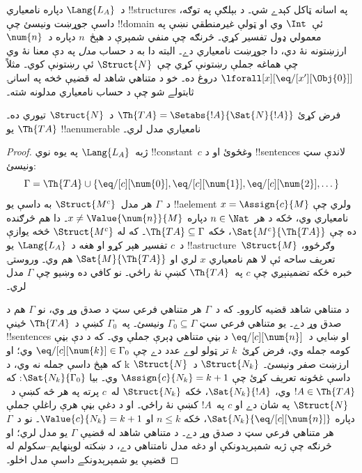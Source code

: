 \documentclass[../../../include/open-logic-section]{subfiles}
\begin{document}
\begin{explain}
د~$\Lang{L_A}$ دپاره نامعياري !!{structure}s په اسانه ټاکل کېدے
شي۔ د بېلګې په توګه، داسې جوړښت ونيسئ چې !!{domain} ئې~$\Int$ وي او
ټولې غيرمنطقي نښې په معمولي ډول تفسير کړي۔ څرنګه چې منفي شمېرې د
هېڅ~$n$ دپاره د~$\num{n}$ ارزښتونه نۀ دي، دا جوړښت نامعياري دے۔
البته دا به د حساب \emph{مدل} په دې معنا نۀ وي چې هماغه جملې رښتونې
کړي چې~$\Struct{N}$ ئې رښتونې کوي۔ مثلاً
$\lforall[x][\eq/[x'][\Obj{0}]]$ دروغ ده۔ خو د متناهي شاهد له قضيې
څخه په اسانۍ ثابتولے شو چې د حساب نامعياري مدلونه شته۔
\end{explain}

\begin{prop}
فرض کړئ $\Th{TA} = \Setabs{!A}{\Sat{N}{!A}}$ د~$\Struct{N}$ تيوري
ده۔ $\Th{TA}$ يو !!a{enumerable} نامعياري مدل لري۔
\end{prop}

\begin{proof}
ژبه~$\Lang{L_A}$ په يوه نوي !!{constant}~$c$ وغځوئ او د
!!{sentence}s لاندې سټ ونيسئ:
\[
\Gamma = \Th{TA} \cup \{\eq/[c][\num{0}], \eq/[c][\num{1}],
\eq/[c][\num{2}], \dots\}
\]
د~$\Gamma$ هر مدل~$\Struct{M^c}$ به داسې يو !!a{element}
$x = \Assign{c}{M}$ ولري چې نامعياري وي، ځکه د هر~$n \in \Nat$
دپاره $x \neq \Value{\num{n}}{M}$۔ دا هم څرګنده ده چې
$\Sat{M^c}{\Th{TA}}$، ځکه $\Th{TA} \subseteq \Gamma$۔ که له
$\Struct{M^c}$ څخه يوازې د~$c$ تفسير هېر کړو او هغه د~$\Lang{L_A}$
يو !!a{structure}~$\Struct{M}$ وګرځوو، تعريف ساحه ئې لا هم نامعياري
$x$ لري او $\Sat{M}{\Th{TA}}$ هم وي۔ وروستۍ خبره ځکه تضمينېږي چې
$c$ په~$\Th{TA}$ کښې نۀ راځي۔ نو کافي ده وښيو چې $\Gamma$ مدل لري۔

د متناهي شاهد قضيه کاروو۔ که د~$\Gamma$ هر متناهي فرعي سټ د صدق وړ
وي، نو $\Gamma$ هم د صدق وړ دے۔ يو متناهي فرعي سټ
$\Gamma_0 \subseteq \Gamma$ ونيسئ۔ په~$\Gamma_0$ کښې د~$\Th{TA}$
ځينې !!{sentence}s او ښايي د~$\eq/[c][\num{n}]$ د بڼې متناهي ډېرې جملې وي۔
که د دې بڼې کومه جمله وي، فرض کړئ~$k$ تر ټولو لوے عدد دے چې
$\eq/[c][\num{k}] \in \Gamma_0$ وي؛ او که هېڅ داسې جمله نه وي، د
k ارزښت صفر ونيسئ۔ $\Struct{N_k}$ د~$\Struct{N}$ داسې غځونه تعريف کړئ چې
$\Assign{c}{N_k} = k+1$ وي۔ بيا $\Sat{N_k}{\Gamma_0}$: که
$!A \in \Th{TA}$ وي، $\Sat{N_k}{!A}$، ځکه $\Struct{N_k}$ له~$c$
پرته په هر څه کښې د~$\Struct{N}$ په شان دے او $c$ په~$!A$ کښې نۀ
راځي۔ او د دغې بڼې هرې راغلې جملې دپاره
$\Sat{N_k}{\eq/[c][\num{n}]}$، ځکه $n \le k$ او
$\Value{c}{N_k} = k+1$۔ نو د~$\Gamma$ هر متناهي فرعي سټ د صدق وړ
دے۔ د متناهي شاهد له قضيې $\Gamma$ يو مدل لري؛ او څرنګه چې ژبه
شمېرېدونکې او دغه مدل نامتناهي دے، د ښکته لوېنهايم--سکولم له قضيې
يو شمېرېدونکے داسې مدل اخلو۔
\end{proof}
\end{document}
